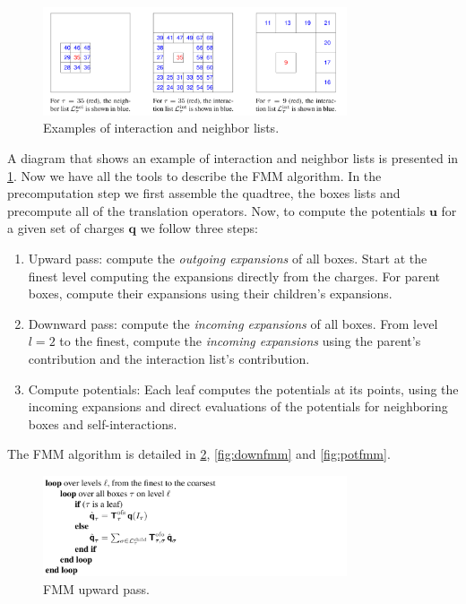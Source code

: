 \documentclass[final,onefignum,onetabnum]{siamart220329}
\newcommand{\bol}{\boldsymbol}
\newcounter{example}
\begin{document}
\begin{figure}[h!]
	\centering
	\includegraphics[width=0.8\textwidth]{ilist}
	\caption{Examples of interaction and neighbor lists.}
	\label{fig:ilist}
\end{figure}

A diagram that shows an example of interaction and neighbor lists is presented in \cref{fig:ilist}. Now we have all the tools to describe the FMM algorithm. In the precomputation step we first assemble the quadtree, the boxes lists and precompute all of the translation operators. Now, to compute the potentials $\bol u$ for a given set of charges $\bol q$ we follow three steps:
\begin{enumerate}
	\item Upward pass: compute the \textit{outgoing expansions} of all boxes. Start at the finest level computing the expansions directly from the charges. For parent boxes, compute their expansions using their children's expansions.
	\item Downward pass: compute the \textit{incoming expansions} of all boxes. From level $l=2$ to the finest, compute the \textit{incoming expansions} using the parent's contribution and the interaction list's contribution.
	\item Compute potentials: Each leaf computes the potentials at its points, using the incoming expansions and direct evaluations of the potentials for neighboring boxes and self-interactions.
\end{enumerate}
The FMM algorithm is detailed in \cref{fig:upfmm}, \cref{fig:downfmm} and \cref{fig:potfmm}.
\begin{figure}[h!]
	\centering
	\includegraphics[width=0.8\textwidth]{upfmm}
	\caption{FMM upward pass.}
	\label{fig:upfmm}
\end{figure}
\end{document}
